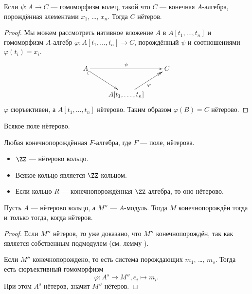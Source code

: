 \documentclass[12pt,a4paper]{article}
\begin{document}
    \begin{lemma}
        Если $\psi: A \to C$ --- гомоморфизм колец, такой что $C$ --- конечная $A$-алгебра, порождённая элементами $x_1$, \dots, $x_n$. Тогда $C$ нётеров.
    \end{lemma}

    \begin{proof}
        Мы можем рассмотреть нативное вложение $A$ в $A[t_1, \dots, t_n]$ и гомоморфизм $A$-алгебр $\varphi: A[t_1, \dots, t_n] \to C$, порождённый $\psi$ и соотношениями $\varphi(t_i) = x_i$.
        \[
            \xymatrix{
                A \ar@{_{(}->}[rd] \ar[rr]^{\psi}&& C\\
                & A[t_1, \dots, t_n] \ar@{->>}[ru]_{\varphi}
            }
        \]
        $\varphi$ сюръективен, а $A[t_1, \dots, t_n]$ нётерово. Таким образом $\varphi(B) = C$ нётерово.
    \end{proof}

    \begin{remark}
        Всякое поле нётерово.
    \end{remark}

    \begin{corollary}
        Любая конечнопорождённая $F$-алгебра, где $F$ --- поле, нётерова.
    \end{corollary}

    \begin{remark}
        \begin{itemize}
            \item $\ZZ$ --- нётерово кольцо.
            \item Всякое кольцо является $\ZZ$-кольцом.
            \item Если кольцо $R$ --- конечнопорождённая $\ZZ$-алгебра, то оно нётерово.
        \end{itemize}
    \end{remark}

    \begin{lemma}
        Пусть $A$ --- нётерово кольцо, а $M''$ --- $A$-модуль. Тогда $M$ конечнопорождён тогда и только тогда, когда нётеров.
    \end{lemma}

    \begin{proof}
        Если $M''$ нётеров, то уже доказано, что $M''$ конечнопорождён, так как является собственным подмодулем (см. лемму ).

        Если $M''$ конечнопорождено, то есть система порождающих $m_1$, \dots, $m_s$. Тогда есть сюръективный гомоморфизм
        \[\varphi: A^s \to M'', e_i \mapsto m_i.\]
        При этом $A^s$ нётеров, значит $M''$ нётеров.
    \end{proof}
\end{document}
